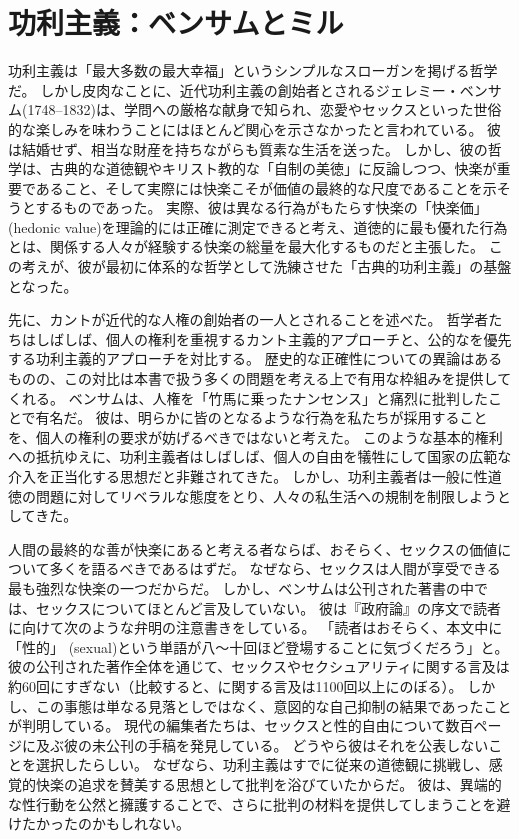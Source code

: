 \documentclass[paper=a4,book,openany]{jlreq} \usepackage{mystyle}
\begin{document}
\section{功利主義：ベンサムとミル}

功利主義は「最大多数の最大幸福」というシンプルなスローガンを掲げる哲学だ。
しかし皮肉なことに、近代功利主義の創始者とされるジェレミー・ベンサム(1748--1832)は、学問への厳格な献身で知られ、恋愛やセックスといった世俗的な楽しみを味わうことにはほとんど関心を示さなかったと言われている。
彼は結婚せず、相当な財産を持ちながらも質素な生活を送った。
しかし、彼の哲学は、古典的な道徳観やキリスト教的な「自制の美徳」に反論しつつ、快楽が重要であること、そして実際には快楽こそが価値の最終的な尺度であることを示そうとするものであった。
実際、彼は異なる行為がもたらす快楽の「快楽価」(hedonic value)を理論的には正確に測定できると考え、道徳的に最も優れた行為とは、関係する人々が経験する快楽の総量を最大化するものだと主張した。
この考えが、彼が最初に体系的な哲学として洗練させた「古典的功利主義」の基盤となった。

先に、カントが近代的な人権の創始者の一人とされることを述べた。
哲学者たちはしばしば、個人の権利を重視するカント主義的アプローチと、公的なを優先する功利主義的アプローチを対比する。
歴史的な正確性についての異論はあるものの、この対比は本書で扱う多くの問題を考える上で有用な枠組みを提供してくれる。
ベンサムは、人権を「竹馬に乗ったナンセンス」と痛烈に批判したことで有名だ。
彼は、明らかに皆のとなるような行為を私たちが採用することを、個人の権利の要求が妨げるべきではないと考えた。
このような基本的権利への抵抗ゆえに、功利主義者はしばしば、個人の自由を犠牲にして国家の広範な介入を正当化する思想だと非難されてきた。
しかし、功利主義者は一般に性道徳の問題に対してリベラルな態度をとり、人々の私生活への規制を制限しようとしてきた。

人間の最終的な善が快楽にあると考える者ならば、おそらく、セックスの価値について多くを語るべきであるはずだ。
なぜなら、セックスは人間が享受できる最も強烈な快楽の一つだからだ。
しかし、ベンサムは公刊された著書の中では、セックスについてほとんど言及していない。
彼は『政府論』の序文で読者に向けて次のような弁明の注意書きをしている。
「読者はおそらく、本文中に「性的」 (sexual)という単語が八〜十回ほど登場することに気づくだろう」と\citep[p.533]{bentham77:_commen_commen_fragm_gover}。
彼の公刊された著作全体を通じて、セックスやセクシュアリティに関する言及は約60回にすぎない（比較すると、に関する言及は1100回以上にのぼる）。
しかし、この事態は単なる見落としではなく、意図的な自己抑制の結果であったことが判明している。
現代の編集者たちは、セックスと性的自由について数百ページに及ぶ彼の未公刊の手稿を発見している。
どうやら彼はそれを公表しないことを選択したらしい。
なぜなら、功利主義はすでに従来の道徳観に挑戦し、感覚的快楽の追求を賛美する思想として批判を浴びていたからだ。
彼は、異端的な性行動を公然と擁護することで、さらに批判の材料を提供してしまうことを避けたかったのかもしれない。
\end{document}
